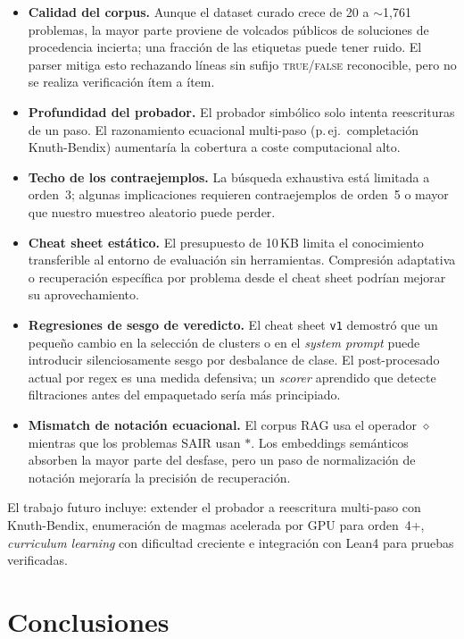 \documentclass{article}
\begin{document}
\begin{itemize}[itemsep=2pt]
  \item \textbf{Calidad del corpus.} Aunque el dataset curado crece de 20 a $\sim$1{,}761 problemas, la mayor parte proviene de volcados p\'ublicos de soluciones de procedencia incierta; una fracci\'on de las etiquetas puede tener ruido. El parser mitiga esto rechazando l\'ineas sin sufijo \textsc{true}/\textsc{false} reconocible, pero no se realiza verificaci\'on \'item a \'item.
  \item \textbf{Profundidad del probador.} El probador simb\'olico solo intenta reescrituras de un paso. El razonamiento ecuacional multi-paso (p.\,ej.\ completaci\'on Knuth-Bendix) aumentar\'ia la cobertura a coste computacional alto.
  \item \textbf{Techo de los contraejemplos.} La b\'usqueda exhaustiva est\'a limitada a orden~3; algunas implicaciones requieren contraejemplos de orden~5 o mayor que nuestro muestreo aleatorio puede perder.
  \item \textbf{Cheat sheet est\'atico.} El presupuesto de 10\,KB limita el conocimiento transferible al entorno de evaluaci\'on sin herramientas. Compresi\'on adaptativa o recuperaci\'on espec\'ifica por problema desde el cheat sheet podr\'ian mejorar su aprovechamiento.
  \item \textbf{Regresiones de sesgo de veredicto.} El cheat sheet \texttt{v1} demostr\'o que un peque\~no cambio en la selecci\'on de clusters o en el \textit{system prompt} puede introducir silenciosamente sesgo por desbalance de clase. El post-procesado actual por regex es una medida defensiva; un \textit{scorer} aprendido que detecte filtraciones antes del empaquetado ser\'ia m\'as principiado.
  \item \textbf{Mismatch de notaci\'on ecuacional.} El corpus RAG usa el operador $\diamond$ mientras que los problemas SAIR usan $*$. Los embeddings sem\'anticos absorben la mayor parte del desfase, pero un paso de normalizaci\'on de notaci\'on mejorar\'ia la precisi\'on de recuperaci\'on.
\end{itemize}

El trabajo futuro incluye: extender el probador a reescritura multi-paso con Knuth-Bendix, enumeraci\'on de magmas acelerada por GPU para orden~4+, \textit{curriculum learning} con dificultad creciente e integraci\'on con Lean4 para pruebas verificadas.

\section{Conclusiones}
\label{sec:conclusions}
\end{document}
